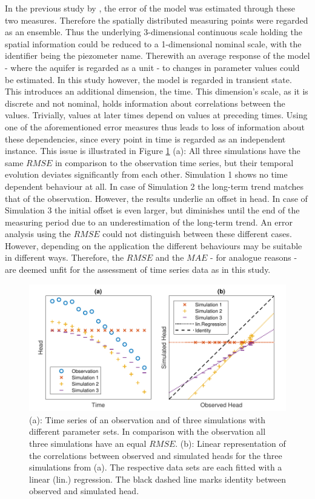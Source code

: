 In the previous study by \textcite{Horn.2021}, the error of the model was estimated through these two measures. Therefore the spatially distributed measuring points were regarded as an ensemble. Thus the underlying 3-dimensional continuous scale holding the spatial information could be reduced to a 1-dimensional nominal scale, with the identifier being the piezometer name. Therewith an average response of the model - where the aquifer is regarded as a unit - to changes in parameter values could be estimated. In this study however, the model is regarded in transient state. This introduces an additional dimension, the time. This dimension's scale, as it is discrete and not nominal, holds information about correlations between the values. Trivially, values at later times depend on values at preceding times. Using one of the aforementioned error measures thus leads to loss of information about these dependencies, since every point in time is regarded as an independent instance. This issue is illustrated in Figure \ref{Fig-RMSEvsCorr} (a): All three simulations have the same $RMSE$ in comparison to the observation time series, but their temporal evolution deviates significantly from each other. Simulation 1 shows no time dependent behaviour at all. In case of Simulation 2 the long-term trend matches that of the observation. However, the results underlie an offset in head. In case of Simulation 3 the initial offset is even larger, but diminishes until the end of the measuring period due to an underestimation of the long-term trend. An error analysis using the $RMSE$ could not distinguish between these different cases. However, depending on the application the different behaviours may be suitable in different ways. Therefore, the $RMSE$ and the $MAE$ - for analogue reasons - are deemed unfit for the assessment of time series data as in this study.

\begin{figure}[h]
    \centering
    \includegraphics{./img/Fig-RMSEvsCorr.pdf}
    \caption{(a): Time series of an observation and of three simulations with different parameter sets. In comparison with the observation all three simulations have an equal $RMSE$. (b): Linear representation of the correlations between observed and simulated heads for the three simulations from (a). The respective data sets are each fitted with a linear (lin.) regression. The black dashed line marks identity between observed and simulated head.}
    \label{Fig-RMSEvsCorr}
\end{figure}

